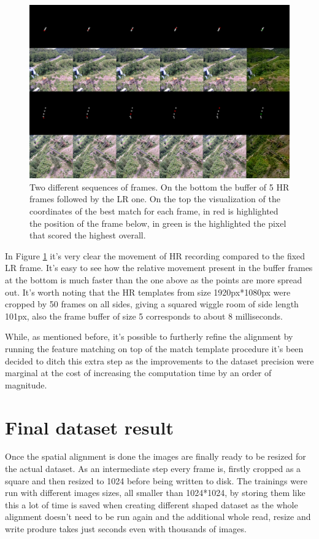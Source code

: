 \begin{figure}[H]
  \centering
  \includegraphics[scale=1.4]{figures/matchtemplate.png}
  \caption{Two different sequences of frames. On the bottom the buffer of 5 HR frames followed by the LR one. On the top the visualization of the coordinates of the best match for each frame, in red is highlighted the position of the frame below, in green is the highlighted the pixel that scored the highest overall.}
  \label{img:matchtempl}
\end{figure}

In Figure \ref{img:matchtempl} it's very clear the movement of HR recording compared to the fixed LR frame. It's easy to see how the relative movement present in the buffer frames at the bottom is much faster than the one above as the points are more spread out. It's worth noting that the HR templates from size 1920px*1080px were cropped by 50 frames on all sides, giving a squared wiggle room of side length 101px, also the frame buffer of size 5 corresponds to about 8 milliseconds.

While, as mentioned before, it's possible to furtherly refine the alignment by running the feature matching on top of the match template procedure it's been decided to ditch this extra step as the improvements to the dataset precision were marginal at the cost of increasing the computation time by an order of magnitude.

\section{Final dataset result}
\label{sec:final_dataset}

Once the spatial alignment is done the images are finally ready to be resized for the actual dataset. As an intermediate step every frame is, firstly cropped as a square and then resized to 1024 before being written to disk. The trainings were run with different images sizes, all smaller than 1024*1024, by storing them like this a lot of time is saved when creating different shaped dataset as the whole alignment doesn't need to be run again and the additional whole read, resize and write produre takes just seconds even with thousands of images.


